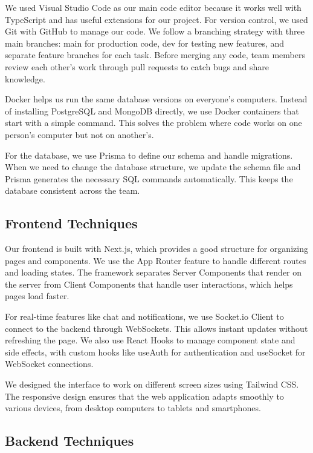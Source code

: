 \documentclass[a4paper,12pt]{report}
\begin{document}
We used Visual Studio Code as our main code editor because it works well with TypeScript and has useful extensions for our project. For version control, we used Git with GitHub to manage our code. We follow a branching strategy with three main branches: main for production code, dev for testing new features, and separate feature branches for each task. Before merging any code, team members review each other's work through pull requests to catch bugs and share knowledge.

Docker helps us run the same database versions on everyone's computers. Instead of installing PostgreSQL and MongoDB directly, we use Docker containers that start with a simple command. This solves the problem where code works on one person's computer but not on another's.

For the database, we use Prisma to define our schema and handle migrations. When we need to change the database structure, we update the schema file and Prisma generates the necessary SQL commands automatically. This keeps the database consistent across the team.

\subsection{Frontend Techniques}

Our frontend is built with Next.js, which provides a good structure for organizing pages and components. We use the App Router feature to handle different routes and loading states. The framework separates Server Components that render on the server from Client Components that handle user interactions, which helps pages load faster.

For real-time features like chat and notifications, we use Socket.io Client to connect to the backend through WebSockets. This allows instant updates without refreshing the page. We also use React Hooks to manage component state and side effects, with custom hooks like useAuth for authentication and useSocket for WebSocket connections.

We designed the interface to work on different screen sizes using Tailwind CSS. The responsive design ensures that the web application adapts smoothly to various devices, from desktop computers to tablets and smartphones.

\subsection{Backend Techniques}
\end{document}
